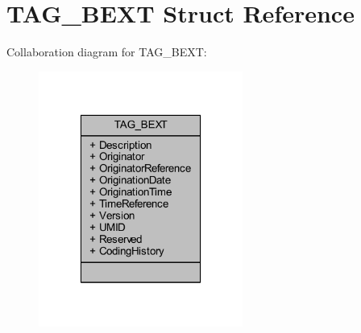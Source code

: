 \hypertarget{struct_t_a_g___b_e_x_t}{\section{T\-A\-G\-\_\-\-B\-E\-X\-T Struct Reference}
\label{struct_t_a_g___b_e_x_t}
}


Collaboration diagram for T\-A\-G\-\_\-\-B\-E\-X\-T\-:\nopagebreak
\begin{figure}[H]
\begin{center}
\leavevmode
\includegraphics[width=190pt]{struct_t_a_g___b_e_x_t__coll__graph}
\end{center}
\end{figure}
